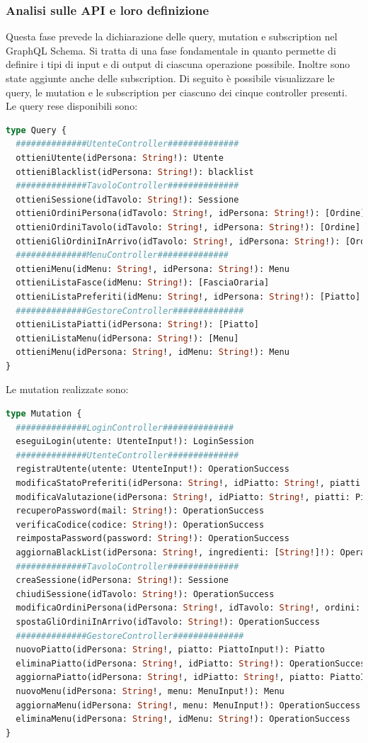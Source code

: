 \subsubsection*{Analisi sulle API e loro definizione}
Questa fase prevede la dichiarazione delle query, mutation e subscription nel GraphQL Schema. Si tratta di una fase fondamentale in quanto permette di definire i tipi di input e di output di ciascuna operazione possibile.
Inoltre sono state aggiunte anche delle subscription. Di seguito è possibile visualizzare le query, le mutation e le subscription per ciascuno dei cinque controller presenti.\\
Le query rese disponibili sono:
\begin{lstlisting}[language=GraphQL]
type Query {
  ##############UtenteController##############
  ottieniUtente(idPersona: String!): Utente
  ottieniBlacklist(idPersona: String!): blacklist
  ##############TavoloController##############
  ottieniSessione(idTavolo: String!): Sessione
  ottieniOrdiniPersona(idTavolo: String!, idPersona: String!): [Ordine]
  ottieniOrdiniTavolo(idTavolo: String!, idPersona: String!): [Ordine]
  ottieniGliOrdiniInArrivo(idTavolo: String!, idPersona: String!): [Ordine]
  ##############MenuController##############
  ottieniMenu(idMenu: String!, idPersona: String!): Menu
  ottieniListaFasce(idMenu: String!): [FasciaOraria]
  ottieniListaPreferiti(idMenu: String!, idPersona: String!): [Piatto]
  ##############GestoreController##############
  ottieniListaPiatti(idPersona: String!): [Piatto]
  ottieniListaMenu(idPersona: String!): [Menu]
  ottieniMenu(idPersona: String!, idMenu: String!): Menu
}
\end{lstlisting}
Le mutation realizzate sono:
\begin{lstlisting}[language=GraphQL]
type Mutation {
  ##############LoginController##############
  eseguiLogin(utente: UtenteInput!): LoginSession
  ##############UtenteController##############
  registraUtente(utente: UtenteInput!): OperationSuccess
  modificaStatoPreferiti(idPersona: String!, idPiatto: String!, piatti: [PiattoInput!]!): OperationSuccess
  modificaValutazione(idPersona: String!, idPiatto: String!, piatti: PiattoPreferito!): OperationSuccess
  recuperoPassword(mail: String!): OperationSuccess
  verificaCodice(codice: String!): OperationSuccess
  reimpostaPassword(password: String!): OperationSuccess
  aggiornaBlackList(idPersona: String!, ingredienti: [String!]!): OperationSuccess
  ##############TavoloController##############
  creaSessione(idPersona: String!): Sessione
  chiudiSessione(idTavolo: String!): OperationSuccess
  modificaOrdiniPersona(idPersona: String!, idTavolo: String!, ordini: [OrdineInput!]!): OperationSuccess
  spostaGliOrdiniInArrivo(idTavolo: String!): OperationSuccess
  ##############GestoreController##############
  nuovoPiatto(idPersona: String!, piatto: PiattoInput!): Piatto
  eliminaPiatto(idPersona: String!, idPiatto: String!): OperationSuccess
  aggiornaPiatto(idPersona: String!, idPiatto: String!, piatto: PiattoInput!): OperationSuccess
  nuovoMenu(idPersona: String!, menu: MenuInput!): Menu
  aggiornaMenu(idPersona: String!, menu: MenuInput!): OperationSuccess
  eliminaMenu(idPersona: String!, idMenu: String!): OperationSuccess
}
\end{lstlisting}
